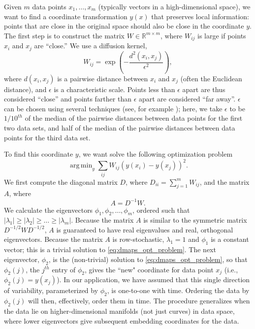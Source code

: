 \documentclass{pnastwo}
\DeclareMathOperator*{\argmin}{arg\,min}
\begin{document}
\begin{article}
Given $m$ data points $x_1, \dots, x_m$ (typically vectors in a high-dimensional space), we want to find a coordinate transformation $y(x)$ that preserves local information: points that are close in the original space should also be close in the coordinate $y$.
%
The first step is to construct the matrix $W \in \mathbb{R}^{m \times m}$, where $W_{ij}$ is large if points $x_i$ and $x_j$ are ``close.''
%
We use a diffusion kernel,
\begin{equation} \label{eq:dmaps_W}
W_{ij} = \exp \left( -\frac{d^2(x_i, x_j)}{\epsilon^2} \right),
\end{equation}
where $d(x_i, x_j)$ is a pairwise distance between $x_i$ and $x_j$ (often the Euclidean distance), and $\epsilon$ is a characteristic scale.
%
Points less than $\epsilon$ apart are thus considered ``close'' and points farther than $\epsilon$ apart are considered ``far away''.
%
$\epsilon$ can be chosen using several techniques (see, for example \cite{coifman2008graph, rohrdanz2011determination}); here, we take $\epsilon$ to be $1/10^{th}$ of the median of the pairwise distances between data points for the first two data sets, and half of the median of the pairwise distances between data points for the third data set.

To find this coordinate $y$, we want solve the following optimization problem \cite{Belkin2003}
\begin{equation} \label{eq:dmaps_opt_problem}
\argmin_{y} \sum_{ij} W_{ij} (y(x_i) - y(x_j))^2.
\end{equation}
%
We first compute the diagonal matrix $D$, where $D_{ii} = \sum_{j=1}^{m} W_{ij}$, and the matrix $A$, where
\begin{equation} \label{eq:dmaps_A}
A = D^{-1} W.
\end{equation}
%
We calculate the eigenvectors $\phi_1, \phi_2, \dots, \phi_m$, ordered such that $|\lambda_1| \ge |\lambda_2| \ge \dots \ge |\lambda_m|$.
%
Because the matrix $A$ is similar to the symmetric matrix $D^{-1/2} W D^{-1/2}$, $A$ is guaranteed to have real eigenvalues and real, orthogonal eigenvectors.
%
Because the matrix $A$ is row-stochastic, $\lambda_1=1$ and $\phi_1$ is a constant vector; this is a trivial solution to \eqref{eq:dmaps_opt_problem}.
%
%
The next eigenvector, $\phi_2$, is the (non-trivial) solution to \eqref{eq:dmaps_opt_problem}, so that $\phi_2(j)$, the $j^{th}$ entry of $\phi_2$, gives the ``new" coordinate for data point $x_j$ (i.e., $\phi_2(j) = y(x_j)$).
%
In our application, we have assumed that this single direction of variability, parameterized by $\phi_2$, is one-to-one with time.
%
Ordering the data by $\phi_2(j)$ will then, effectively, order them in time.
%
The procedure generalizes when the data lie on higher-dimensional manifolds (not just curves) in data space, where lower eigenvectors give subsequent embedding coordinates for the data.
%


\end{article}
\end{document}
